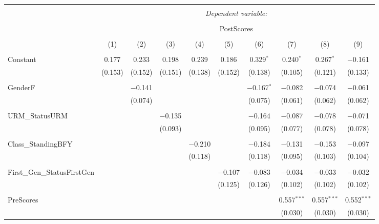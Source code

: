 
\begin{table}[!htbp] \centering 
  \caption{} 
  \label{} 
\begin{tabular}{@{\extracolsep{5pt}}lccccccccc} 
\\[-1.8ex]\hline 
\hline \\[-1.8ex] 
 & \multicolumn{9}{c}{\textit{Dependent variable:}} \\ 
\cline{2-10} 
\\[-1.8ex] & \multicolumn{9}{c}{PostScores} \\ 
\\[-1.8ex] & (1) & (2) & (3) & (4) & (5) & (6) & (7) & (8) & (9)\\ 
\hline \\[-1.8ex] 
 Constant & 0.177 & 0.233 & 0.198 & 0.239 & 0.186 & 0.329$^{*}$ & 0.240$^{*}$ & 0.267$^{*}$ & $-$0.161 \\ 
  & (0.153) & (0.152) & (0.151) & (0.138) & (0.152) & (0.138) & (0.105) & (0.121) & (0.133) \\ 
  & & & & & & & & & \\ 
 GenderF &  & $-$0.141 &  &  &  & $-$0.167$^{*}$ & $-$0.082 & $-$0.074 & $-$0.061 \\ 
  &  & (0.074) &  &  &  & (0.075) & (0.061) & (0.062) & (0.062) \\ 
  & & & & & & & & & \\ 
 URM\_StatusURM &  &  & $-$0.135 &  &  & $-$0.164 & $-$0.087 & $-$0.078 & $-$0.071 \\ 
  &  &  & (0.093) &  &  & (0.095) & (0.077) & (0.078) & (0.078) \\ 
  & & & & & & & & & \\ 
 Class\_StandingBFY &  &  &  & $-$0.210 &  & $-$0.184 & $-$0.131 & $-$0.153 & $-$0.097 \\ 
  &  &  &  & (0.118) &  & (0.118) & (0.095) & (0.103) & (0.104) \\ 
  & & & & & & & & & \\ 
 First\_Gen\_StatusFirstGen &  &  &  &  & $-$0.107 & $-$0.083 & $-$0.034 & $-$0.033 & $-$0.032 \\ 
  &  &  &  &  & (0.125) & (0.126) & (0.102) & (0.102) & (0.102) \\ 
  & & & & & & & & & \\ 
 PreScores &  &  &  &  &  &  & 0.557$^{***}$ & 0.557$^{***}$ & 0.552$^{***}$ \\ 
  &  &  &  &  &  &  & (0.030) & (0.030) & (0.030) \\ 

\end{tabular}
\end{table}
